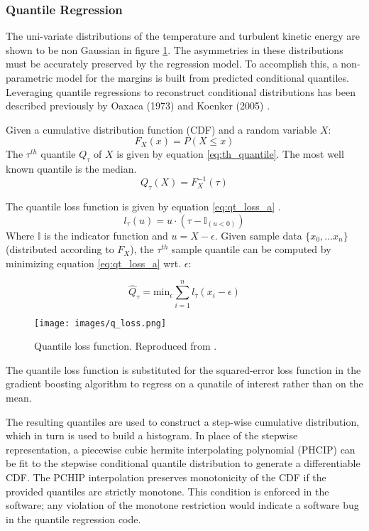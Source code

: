 \subsubsection{Quantile Regression}

The uni-variate distributions of the temperature and turbulent kinetic energy are shown to be non Gaussian in figure \ref{fig:ctf_patch_dist}.  The asymmetries in these distributions must be accurately preserved by the regression model.  To accomplish this, a non-parametric model for the margins is built from predicted conditional quantiles.  Leveraging quantile regressions to reconstruct conditional distributions has been described previously by Oaxaca (1973) and Koenker (2005) \cite{koenker05}.

Given a cumulative distribution function (CDF) and a random variable $X$:
\begin{equation}
F_X(x) = P(X \leq x)
\end{equation}
The $\tau^{th}$ quantile $Q_\tau$ of $X$ is given by equation \ref{eq:th_quantile}.  The most well known quantile is the median.
\begin{equation}
Q_\tau(X) = F_X^{-1}(\tau)
\label{eq:th_quantile}
\end{equation}

The quantile loss function is given by equation \ref{eq:qt_loss_a} \cite{koenker05}.
\begin{equation}
l_\tau(u) = u \cdot (\tau - \mathbb{I}_{(u < 0)})
\label{eq:qt_loss_a}
\end{equation}
Where $\mathbb{I}$ is the indicator function and $u=X - \epsilon$.
Given sample data $\{x_0, ... x_n\}$ (distributed according to $F_X$), the $\tau^{th}$ sample quantile can be computed by minimizing equation \ref{eq:qt_loss_a} wrt. $\epsilon$:

\begin{equation}
\hat Q_\tau = \mathrm{min}_\epsilon \sum_{i=1}^n l_\tau (x_i - \epsilon)
\end{equation}

\begin{figure}[!htbp]
\centering
\texttt{[image: images/q\_loss.png]}
\caption{Quantile loss function.  Reproduced from \cite{koenker05}.}
\label{fig:ctf_patch_dist}
\end{figure}

The quantile loss function is substituted for the squared-error loss function in the gradient boosting algorithm to regress on a qunatile of interest rather than on the mean.  

The resulting quantiles are used to construct a step-wise cumulative distribution, which in turn is used to build a histogram. 
In place of the stepwise representation, a piecewise cubic hermite interpolating polynomial (PHCIP) can be fit to the stepwise conditional quantile distribution to generate a differentiable CDF.
The PCHIP interpolation preserves monotonicity of the CDF if the provided quantiles are strictly monotone.  This condition is enforced in the software; any violation of the monotone restriction would indicate a software bug in the quantile regression code.

